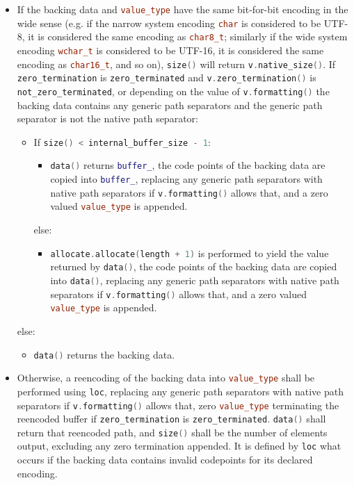 \documentclass[11pt]{article}
\newcommand{\code}[2][cpp]{\lstinline[language=#1,basicstyle=\small\ttfamily]{#2}}
\begin{document}
\begin{itemize}
    \item If the backing data and \code{value_type} have the same bit-for-bit encoding in the wide sense (e.g. if the narrow system encoding \code{char} is considered to be UTF-8, it is considered the same encoding as \code{char8_t}; similarly if the wide system encoding \code{wchar_t} is considered to be UTF-16, it is considered the same encoding as \code{char16_t}, and so on), \code{size()} will return \code{v.native_size()}. If \code{zero_termination} is \code{zero_terminated} and \code{v.zero_termination()} is \code{not_zero_terminated}, or depending on the value of \code{v.formatting()} the backing data contains any generic path separators and the generic path separator is not the native path separator:
    \begin{itemize}
        \item If \code{size() < internal_buffer_size - 1}:
        \begin{itemize}
            \item \code{data()} returns \code{buffer_}, the code points of the backing data are copied into \code{buffer_}, replacing any generic path separators with native path separators if \code{v.formatting()} allows that, and a zero valued \code{value_type} is appended. 
        \end{itemize}
        else:
        \begin{itemize}
            \item \code{allocate.allocate(length + 1)} is performed to yield the value returned by \code{data()}, the code points of the backing data are copied into \code{data()}, replacing any generic path separators with native path separators if \code{v.formatting()} allows that, and a zero valued \code{value_type} is appended.
        \end{itemize}
    \end{itemize}
    else:
    \begin{itemize}
        \item \code{data()} returns the backing data.
    \end{itemize}

    \item Otherwise, a reencoding of the backing data into \code{value_type} shall be performed using \code{loc}, replacing any generic path separators with native path separators if \code{v.formatting()} allows that, zero \code{value_type} terminating the reencoded buffer if \code{zero_termination} is \code{zero_terminated}. \code{data()} shall return that reencoded path, and \code{size()} shall be the number of elements output, excluding any zero termination appended. It is defined by \code{loc} what occurs if the backing data contains invalid codepoints for its declared encoding.


\end{itemize}
\end{document}

